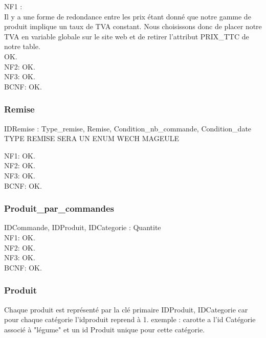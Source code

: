 \documentclass[a4paper, 12pt]{report}
\begin{document}
\begin{spacing}{1.2}
NF1 : \\
Il y a une forme de redondance entre les prix étant donné que notre gamme de produit implique un taux de TVA constant. Nous choisissons donc de placer notre TVA en variable globale sur le site web et de retirer l'attribut PRIX\_TTC de notre table.\\

OK.\\

NF2: OK.\\
NF3: OK.\\
BCNF: OK.\\

\textcolor{colortitre3}{\subsubsection*{\hypertarget{Remise}{Remise}}}

IDRemise : Type\_remise, Remise, Condition\_nb\_commande, Condition\_date\\

TYPE REMISE SERA UN ENUM WECH MAGEULE



NF1: OK.\\
NF2: OK.\\
NF3: OK.\\
BCNF: OK.\\


\textcolor{colortitre3}{\subsubsection*{\hypertarget{ppc}{Produit\_par\_commandes}}}

IDCommande, IDProduit, IDCategorie : Quantite\\

NF1: OK.\\
NF2: OK.\\
NF3: OK.\\
BCNF: OK.\\

\textcolor{colortitre3}{\subsubsection*{\hypertarget{Produit}{Produit}}}

Chaque produit est représenté par la clé primaire IDProduit, IDCategorie car pour chaque catégorie l'idproduit reprend à 1. exemple : carotte a l'id Catégorie associé à "légume" et un id Produit unique pour cette catégorie.


\end{spacing}
\end{document}
